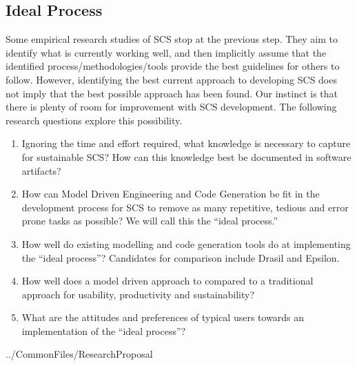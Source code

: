 \documentclass[12pt]{article}
\begin{document}
\subsection{Ideal Process}

Some empirical research studies of SCS stop at the previous step.  They aim to
identify what is currently working well, and then implicitly assume that the
identified process/methodologies/tools provide the best guidelines for others to
follow.  However, identifying the best current approach to developing SCS does
not imply that the best possible approach has been found.  Our instinct is that
there is plenty of room for improvement with SCS development.  The following
research questions explore this possibility.

\begin{enumerate}
\item Ignoring the time and effort required, what knowledge is necessary to
  capture for sustainable SCS?  How can this knowledge best be documented in
  software artifacts?
\item How can Model Driven Engineering and Code Generation be fit in the
  development process for SCS to remove as many repetitive, tedious and error
  prone tasks as possible?  We will call this the ``ideal process.''
\item How well do existing modelling and code generation tools do at
  implementing the ``ideal process''?  Candidates for comparison include Drasil
  and Epsilon.
\item How well does a model driven approach to compared to a traditional
  approach for usability, productivity and sustainability?
\item What are the attitudes and preferences of typical users towards
  an implementation of the ``ideal process''?
\end{enumerate}


 {../CommonFiles/ResearchProposal}
\end{document}
